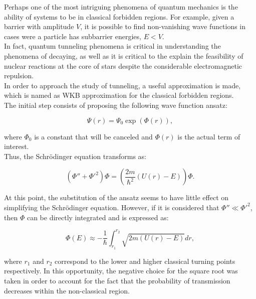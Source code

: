 \documentclass[openany]{book}
\begin{document}
Perhaps one of the most intriguing phenomena of quantum mechanics is the ability of systems to be in classical forbidden regions. For example, given a barrier with amplitude $V$, it is possible to find non-vanishing wave functions in cases were a particle has subbarrier energies, $E < V$. \\

In fact, quantum tunneling phenomena is critical in understanding the phenomena of decaying, as well as it is critical to the explain the feasibility of nuclear reactions at the core of stars despite the considerable electromagnetic repulsion. \\

In order to approach the study of tunneling, a useful approximation is made, which is named as WKB approximation for the classical forbidden regions. \\

The initial step consists of proposing the following wave function ansatz: 

\begin{equation} \label{eq:WKB_ansatz}
	\Psi(r) = \Psi_0\exp{(\Phi(r))},
\end{equation}

where $\Phi_0$ is a constant that will be canceled and $\Phi(r)$ is the actual term of interest. \\

Thus, the Schrödinger equation transforms as: 

\begin{equation} \label{eq:WKB_schrodinger}
	\left(\Phi'' + \Phi'^{2} \right)\Phi = \left(\frac{2m}{\hbar^2} (U(r) - E)\right) \Phi.
\end{equation}

At this point, the substitution of the ansatz seems to have little effect on simplifying the Schrödinger equation. However,  if it is considered that $\Phi'' \ll \Phi'^{2}$, then $\Phi$ can be directly integrated and is expressed as:

\begin{equation} \label{eq:WKB_definition}
	\Phi(E) \approx -\frac{1}{\hbar}\int_{r_1}^{r_2} {\sqrt{2m(U(r)-E)}} dr,
\end{equation}

where $r_1$ and $r_2$ correspond to the lower and higher classical turning points respectively. In this opportunity, the negative choice for the square root was taken in order to account for the fact that the probability of transmission decreases within the non-classical region. \\
\end{document}
